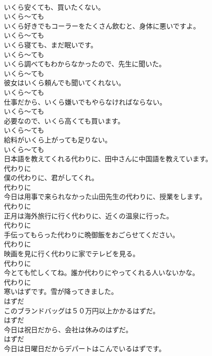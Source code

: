 \documentclass[8pt]{extreport}
\begin{document}
\begin{CJK}{UTF8}{min}
\\	いくら安くても、買いたくない。	
\\	いくら～ても	
\\	いくら好きでもコーラーをたくさん飲むと、身体に悪いですよ。	
\\	いくら～ても	
\\	いくら寝ても、まだ眠いです。	
\\	いくら～ても	
\\	いくら調べてもわからなかったので、先生に聞いた。	
\\	いくら～ても	
\\	彼女はいくら頼んでも聞いてくれない。	
\\	いくら～ても	
\\	仕事だから、いくら嫌いでもやらなければならない。	
\\	いくら～ても	
\\	必要なので、いくら高くても買います。	
\\	いくら～ても	
\\	給料がいくら上がっても足りない。	
\\	いくら～ても	
\\	日本語を教えてくれる代わりに、田中さんに中国語を教えています。	
\\	代わりに	
\\	僕の代わりに、君がしてくれ。	
\\	代わりに	
\\	今日は用事で来られなかった山田先生の代わりに、授業をします。	
\\	代わりに	
\\	正月は海外旅行に行く代わりに、近くの温泉に行った。	
\\	代わりに	
\\	手伝ってもらった代わりに晩御飯をおごらせてください。	
\\	代わりに	
\\	映画を見に行く代わりに家でテレビを見る。	
\\	代わりに	
\\	今とても忙しくてね。誰か代わりにやってくれる人いないかな。	
\\	代わりに	
\\	寒いはずです。雪が降ってきました。	
\\	はずだ	
\\	このブランドバッグは５０万円以上かかるはずだ。	
\\	はずだ	
\\	今日は祝日だから、会社は休みのはずだ。	
\\	はずだ	
\\	今日は日曜日だからデパートはこんでいるはずです。	

\end{CJK}
\end{document}
